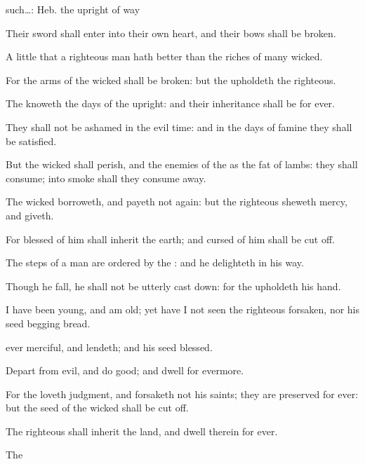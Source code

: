 {{such…: Heb. the upright of way}
\par }{\Q {}Their
sword shall
enter into their own
heart, and their
bows shall be
broken.
\par }{\Q {}A
little that a righteous
man hath
{}
better than the
riches of
many
wicked.
\par }{\Q {}For the
arms of the
wicked shall be
broken: but the
{}
upholdeth the
righteous.
\par }{\Q {}The
{}
knoweth the
days of the
upright: and their
inheritance shall be for
ever.
\par }{\Q {}They shall not be
ashamed in the
evil
time: and in the
days of
famine they shall be
satisfied.
\par }{\Q {}But the
wicked shall
perish, and the
enemies of the
{}
{} as the
fat of
lambs: they shall
consume; into
smoke shall they consume
away.
\par }{\BB \par }{\Q {}The
wicked
borroweth, and payeth not
again: but the
righteous sheweth
mercy, and
giveth.
\par }{\Q {}For
{}
blessed of him shall
inherit the
earth; and
{}
cursed of him shall be cut
off.
\par }{\Q {}The
steps of a
{}
man are
ordered by the
{}: and he
delighteth in his
way.
\par }{\Q {}Though he
fall, he shall not be utterly cast
down: for the
{}
upholdeth
{} his
hand.
\par }{\Q {}I have been
young, and
{} am
old; yet have I not
seen the
righteous
forsaken, nor his
seed
begging
bread.
\par }{\Q {}
ever
merciful, and
lendeth; and his
seed
{}
blessed.
\par }{\Q {}Depart from
evil, and
do
good; and
dwell for
evermore.
\par }{\Q {}For the
{}
loveth
judgment, and
forsaketh not his
saints; they are
preserved for
ever: but the
seed of the
wicked shall be cut
off.
\par }{\Q {}The
righteous shall
inherit the
land, and
dwell therein for
ever.
\par }{\Q {}The
}
